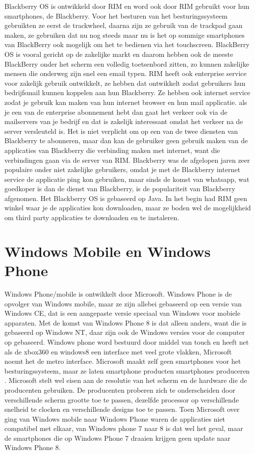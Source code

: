 Blackberry OS is ontwikkeld door RIM en word ook door RIM gebruikt voor hun smartphones, de Blackberry. Voor het besturen van het besturingssysteem gebruikten ze eerst de trackwheel, daarna zijn ze gebruik van de trackpad gaan maken, ze gebruiken dat nu nog steeds maar nu is het op sommige smartphones van BlackBerry ook mogelijk om het te bedienen via het touchscreen. BlackBerry OS is vooral gericht op de zakelijke markt en daarom hebben ook de meeste BlackBerry onder het scherm een volledig toetsenbord zitten, zo kunnen zakelijke mensen die onderweg zijn snel een email typen. RIM heeft ook enterprise service voor zakelijk gebruik ontwikkelt, ze hebben dat ontwikkelt zodat gebruikers hun bedrijfsmail kunnen koppelen aan hun Blackberry. Ze hebben ook internet service zodat je gebruik kan maken van hun internet browser en hun mail applicatie.  als je een van de enterprise abonnement hebt dan gaat het verkeer ook via de mailservers van je bedrijf en dat is zakelijk interessant omdat het verkeer na de server versleuteld is\citep{webwereld}. Het is niet verplicht om op een van de twee diensten van Blackberry te abonneren, maar dan kan de gebruiker geen gebruik maken van de applicaties van Blackberry die verbinding maken met internet, want die verbindingen gaan via de server van RIM\citep{wikipedia}. Blackberry was de afgelopen jaren zeer populaire onder niet zakelijke gebruikers, omdat je met de Blackberry internet service de applicatie ping kon gebruiken, maar sinds de komst van whatsapp, wat goedkoper is dan de dienst van Blackberry, is de populariteit van Blackberry afgenomen\citep{consumentenbond}. Het Blackberry OS is gebaseerd op Java. In het begin had RIM geen winkel waar je de applicaties kon downloaden, maar ze boden wel de mogelijkheid om third party applicaties te downloaden en te instaleren.

\section{Windows Mobile en Windows Phone}

Windows Phone/mobile is ontwikkelt door Microsoft. Windows Phone is de opvolger van Windows mobile, maar ze zijn allebei gebaseerd op een versie van Windows CE, dat is een aangepaste versie speciaal van Windows voor mobiele apparaten. Met de komst van Windows Phone 8 is dat alleen anders, want die is gebaseerd op Windows NT, daar zijn ook de Windows versies voor de computer op gebaseerd. Windows phone word bestuurd door middel van touch en heeft net als de xbox360 en windows8 een interface met veel grote vlakken, Microsoft noemt het de metro interface. Microsoft maakt zelf geen smartphones voor het besturingssysteem, maar ze laten smartphone producten smartphones produceren \citep{nrc}. Microsoft stelt wel eisen aan de resolutie van het scherm en de hardware die de producenten gebruiken. De producenten proberen zich te onderscheiden door verschillende scherm grootte toe te passen, dezelfde processor op verschillende snelheid te clocken en verschillende designs toe te passen. Toen Microsoft over ging van Windows mobile naar Windows Phone waren de applicaties niet compatibel met elkaar, van Windows phone 7 naar 8 is dat wel het geval, maar de smartphones die op Windows Phone 7 draaien krijgen geen update naar Windows Phone 8\citep{tweakers}.
 
 
